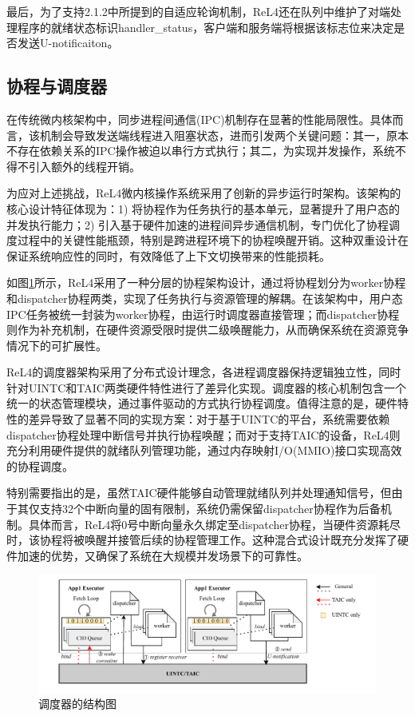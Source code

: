 最后，为了支持2.1.2中所提到的自适应轮询机制，ReL4还在队列中维护了对端处理程序的就绪状态标识handler\_status，客户端和服务端将根据该标志位来决定是否发送U-notificaiton。

\subsection{协程与调度器}
在传统微内核架构中，同步进程间通信(IPC)机制存在显著的性能局限性。具体而言，该机制会导致发送端线程进入阻塞状态，进而引发两个关键问题：其一，原本不存在依赖关系的IPC操作被迫以串行方式执行；其二，为实现并发操作，系统不得不引入额外的线程开销。

为应对上述挑战，ReL4微内核操作系统采用了创新的异步运行时架构。该架构的核心设计特征体现为：1) 将协程作为任务执行的基本单元，显著提升了用户态的并发执行能力；2) 引入基于硬件加速的进程间异步通信机制，专门优化了协程调度过程中的关键性能瓶颈，特别是跨进程环境下的协程唤醒开销。这种双重设计在保证系统响应性的同时，有效降低了上下文切换带来的性能损耗。

如图\ref{fig:executor}所示，ReL4采用了一种分层的协程架构设计，通过将协程划分为worker协程和dispatcher协程两类，实现了任务执行与资源管理的解耦。在该架构中，用户态IPC任务被统一封装为worker协程，由运行时调度器直接管理；而dispatcher协程则作为补充机制，在硬件资源受限时提供二级唤醒能力，从而确保系统在资源竞争情况下的可扩展性。

ReL4的调度器架构采用了分布式设计理念，各进程调度器保持逻辑独立性，同时针对UINTC和TAIC两类硬件特性进行了差异化实现。调度器的核心机制包含一个统一的状态管理模块，通过事件驱动的方式执行协程调度。值得注意的是，硬件特性的差异导致了显著不同的实现方案：对于基于UINTC的平台，系统需要依赖dispatcher协程处理中断信号并执行协程唤醒；而对于支持TAIC的设备，ReL4则充分利用硬件提供的就绪队列管理功能，通过内存映射I/O(MMIO)接口实现高效的协程调度。

特别需要指出的是，虽然TAIC硬件能够自动管理就绪队列并处理通知信号，但由于其仅支持32个中断向量的固有限制，系统仍需保留dispatcher协程作为后备机制。具体而言，ReL4将0号中断向量永久绑定至dispatcher协程，当硬件资源耗尽时，该协程将被唤醒并接管后续的协程管理工作。这种混合式设计既充分发挥了硬件加速的优势，又确保了系统在大规模并发场景下的可靠性。


\begin{figure}[htbp]
  \centering
  \includegraphics[width=1.0\textwidth]{figures/TAIC.drawio.pdf}
  \caption{调度器的结构图}\label{fig:executor}
\end{figure}

